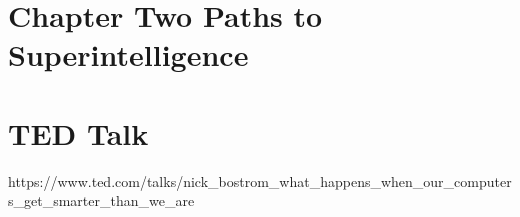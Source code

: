 \documentclass{scrartcl}
\begin{document}
\section*{Chapter Two Paths to Superintelligence}

\section*{TED Talk}
https://www.ted.com/talks/nick\_bostrom\_what\_happens\_when\_our\_computers\_get\_smarter\_than\_we\_are
\end{document}
